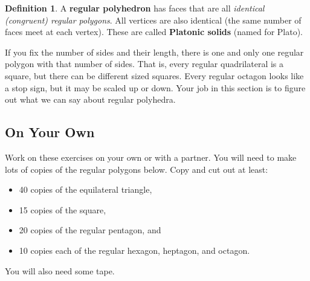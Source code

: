 \documentclass[12pt, reqno]{amsart}
\theoremstyle{remark}
\theoremstyle{definition}
\newtheorem{define}[thm]{Definition}
\numberwithin{equation}{section}  %
\begin{document}
\begin{define}
A {\bf regular polyhedron} has  faces that are all  \emph{identical (congruent) regular polygons}.  All vertices are also identical (the same number of faces meet at each vertex).  These are called {\bf Platonic solids} (named for Plato).
\end{define}

If you fix the number of sides and their length, there is one and only one regular polygon with that number of sides.  That is, every regular quadrilateral is a square, but there can be different sized squares.  Every regular octagon looks like a stop sign, but it may be scaled up or down.  Your job in this section is to figure out what we can say about regular polyhedra.


\subsection*{On Your Own}
Work on these exercises on your own or with a partner.  You will need to make lots of copies of the regular polygons below.  Copy and cut out at least:
\begin{itemize}
\item
40 copies of the equilateral triangle,
\item
15 copies of the square,
\item
20 copies of the regular pentagon, and
\item
10 copies each of the regular hexagon, heptagon, and octagon.
\end{itemize}
You will also need some tape.
\end{document}
